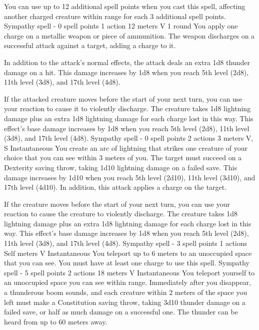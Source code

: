         You can use up to 12 additional spell points when you cast this spell, affecting another charged creature within range for each 3 additional spell points.
        {Sympathy spell - 0 spell points}
        {1 action}
        {12 meters}
        {V}
        {1 round}
        You apply one charge on a metallic weapon or piece of ammunition.
        The weapon discharges on a successful attack against a target, adding a charge to it.

        In addition to the attack's normal effects, the attack deals an extra 1d8 thunder damage on a hit.
        This damage increases by 1d8 when you reach 5th level (2d8), 11th level (3d8), and 17th level (4d8).

        If the attacked creature moves before the start of your next turn, you can use your reaction to cause it to violently discharge.
        The creature takes 1d8 lightning damage plus an extra 1d8 lightning damage for each charge lost in this way.
        This effect's base damage increases by 1d8 when you reach 5th level (2d8), 11th level (3d8), and 17th level (4d8).
        {Sympathy spell - 0 spell points}
        {2 actions}
        {3 meters}
        {V, S}
        {Instantaneous}
        You create an arc of lightning that strikes one creature of your choice that you can see within 3 meters of you.
        The target must succeed on a Dexterity saving throw, taking 1d10 lightning damage on a failed save.
        This damage increases by 1d10 when you reach 5th level (2d10), 11th level (3d10), and 17th level (4d10).
        In addition, this attack applies a charge on the target.

        If the creature moves before the start of your next turn, you can use your reaction to cause the creature to violently discharge.
        The creature takes 1d8 lightning damage plus an extra 1d8 lightning damage for each charge lost in this way.
        This effect's base damage increases by 1d8 when you reach 5th level (2d8), 11th level (3d8), and 17th level (4d8).
        {Sympathy spell - 3 spell points}
        {1 actions}
        {Self meters}
        {V}
        {Instantaneous}
        You teleport up to 6 meters to an unoccupied space that you can see.
        You must have at least one charge to use this spell.
        {Sympathy spell - 5 spell points}
        {2 actions}
        {18 meters}
        {V}
        {Instantaneous}
        You teleport yourself to an unoccupied space you can see within range.
        Immediately after you disappear, a thunderous boom sounds, and each creature within 2 meters of the space you left must make a Constitution saving throw, taking 3d10 thunder damage on a failed save, or half as much damage on a successful one.
        The thunder can be heard from up to 60 meters away.

